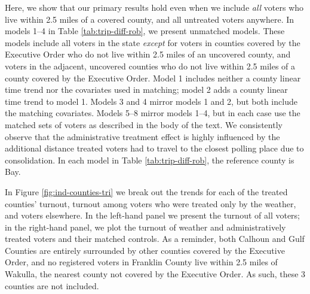 \documentclass[
  12pt,
]{article}
\begin{document}
Here, we show that our primary results hold even when we include \emph{all} voters who live within 2.5 miles of a covered county, and all untreated voters anywhere. In models 1--4 in Table \ref{tab:trip-diff-rob}, we present unmatched models. These models include all voters in the state \emph{except} for voters in counties covered by the Executive Order who do not live within 2.5 miles of an uncovered county, and voters in the adjacent, uncovered counties who do not live within 2.5 miles of a county covered by the Executive Order. Model 1 includes neither a county linear time trend nor the covariates used in matching; model 2 adds a county linear time trend to model 1. Models 3 and 4 mirror models 1 and 2, but both include the matching covariates. Models 5--8 mirror models 1--4, but in each case use the matched sets of voters as described in the body of the text. We consistently observe that the administrative treatment effect is highly influenced by the additional distance treated voters had to travel to the closest polling place due to consolidation. In each model in Table \ref{tab:trip-diff-rob}, the reference county is Bay.

\begin{landscape}
\begin{singlespace}

\end{singlespace}
\end{landscape}

In Figure \ref{fig:ind-counties-tri} we break out the trends for each of the treated counties' turnout, turnout among voters who were treated only by the weather, and voters elsewhere. In the left-hand panel we present the turnout of all voters; in the right-hand panel, we plot the turnout of weather and administratively treated voters and their matched controls. As a reminder, both Calhoun and Gulf Counties are entirely surrounded by other counties covered by the Executive Order, and no registered voters in Franklin County live within 2.5 miles of Wakulla, the nearest county not covered by the Executive Order. As such, these 3 counties are not included.
\end{document}
